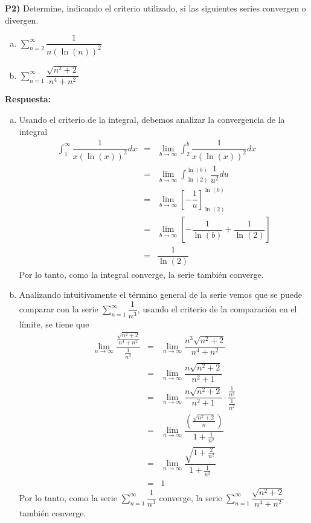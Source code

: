 \documentclass{article}
\begin{document}
\newpage
\noindent\textbf{P2) } Determine, indicando el criterio utilizado, si las siguientes series convergen o divergen.
\begin{enumerate}[a)]
  \item $\displaystyle\sum_{n=2}^{\infty} \dfrac{1}{n(\ln(n))^2}$
  \item $\displaystyle\sum_{n=1}^{\infty} \dfrac{\sqrt{n^2+2}}{n^4+n^2}$
\end{enumerate}

\vspace{5mm}
\noindent\textbf{Respuesta:}
\begin{enumerate}[a)]
  \item Usando el criterio de la integral, debemos analizar la convergencia de la integral
  \begin{eqnarray*}
    \int_{1}^{\infty} \dfrac{1}{x(\ln(x))^2}dx 
      &=& \lim_{b\to\infty}\int_{2}^{b} \dfrac{1}{x(\ln(x))^2}dx\\
      &=& \lim_{b\to\infty}\int_{\ln(2)}^{\ln(b)} \dfrac{1}{u^2}du\\
      &=& \lim_{b\to\infty}\left[-\dfrac{1}{u}\right]_{\ln(2)}^{\ln(b)}\\
      &=& \lim_{b\to\infty}\left[-\dfrac{1}{\ln(b)} + \dfrac{1}{\ln(2)}\right]\\
      &=& \dfrac{1}{\ln(2)}
  \end{eqnarray*}
  Por lo tanto, como la integral converge, la serie también converge.\\

  \item Analizando intuitivamente el término general de la serie vemos que se puede comparar con la serie $\displaystyle\sum_{n=1}^{\infty} \dfrac{1}{n^3}$, usando el criterio de la comparación en el límite, se tiene que
  \begin{eqnarray*}
    \lim_{n\to\infty} \dfrac{\frac{\sqrt{n^2+2}}{n^4+n^2}}{\frac{1}{n^3}} 
      &=& \lim_{n\to\infty} \dfrac{n^3\sqrt{n^2+2}}{n^4+n^2}\\
      &=& \lim_{n\to\infty} \dfrac{n\sqrt{n^2+2}}{n^2+1}\\
      &=& \lim_{n\to\infty} \dfrac{n\sqrt{n^2+2}}{n^2+1}\cdot\dfrac{\frac{1}{n^2}}{\frac{1}{n^2}}\\
      &=& \lim_{n\to\infty} \dfrac{\left(\frac{\sqrt{n^2+2}}{n}\right)}{1+\frac{1}{n^2}}\\
      &=& \lim_{n\to\infty} \dfrac{\sqrt{1+\frac{2}{n^2}}}{1+\frac{1}{n^2}}\\
      &=& 1
  \end{eqnarray*}
  Por lo tanto, como la serie $\displaystyle\sum_{n=1}^{\infty} \dfrac{1}{n^3}$ converge, la serie $\displaystyle\sum_{n=1}^{\infty} \dfrac{\sqrt{n^2+2}}{n^4+n^2}$ también converge.
\end{enumerate}
\end{document}
